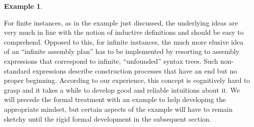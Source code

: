 \documentclass[10pt,a4paper]{amsart}
\theoremstyle{definition}
\newtheorem{exa}[exa]{Example}
\numberwithin{equation}{section}
\theoremstyle{plain}
\theoremstyle{definition}
\newtheorem{example}[example]{Example}
\theoremstyle{myexample}
\renewenvironment{example}%
{
	\begin{shaded*}	
		\vspace{-1.5ex}
		\begin{exa}%
		}{
		\end{exa}
		\vspace{-1.5ex}
	\end{shaded*}
}
\theoremstyle{plain}
\theoremstyle{definition}
\newcommand{\origcol}{o}
\newcommand{\newconst}[1]{\pred{New}_{\const{#1}}} %
\newcommand{\newanon}{\pred{New}_{\const{*}}} %
\newcommand{\cadd}[4]{#4\pred{\texttt{-}Add}^{#3}_{#1#2}} %
\newcommand{\radd}[4]{#4\pred{\texttt{-}Add}^{#3}_{#1#2}}
\newcommand{\unradd}[2]{#2\pred{\texttt{-}Add}_{#1}}
\newcommand{\recol}[2]{#2\pred{\texttt{-}ReCol}_{#1}}
\newcommand{\pred}[1]{\mathtt{#1}}
\newcommand{\const}[1]{\mathtt{#1}}
\newcommand{\epred}{\pred{E}}
\begin{document}
\begin{example}
{}
\\[-2ex]
\end{example}


%

For finite instances, as in the example just discussed, the underlying ideas are very much in line with the notion of inductive definitions and should be easy to comprehend.
Opposed to this, for infinite instances, the much more elusive idea of an ``infinite assembly plan'' has to be implemented by resorting to assembly expressions that correspond to infinite, ``unfounded'' syntax trees. Such non-standard expressions describe construction processes that have an end but no proper beginning. According to our experience, this concept is cognitively hard to grasp and it takes a while to develop good and reliable intuitions about it. We will precede the formal treatment with an example to help developing the appropriate mindset, but certain aspects of the example will have to remain sketchy until the rigid formal development in the subsequent section.
\end{document}
